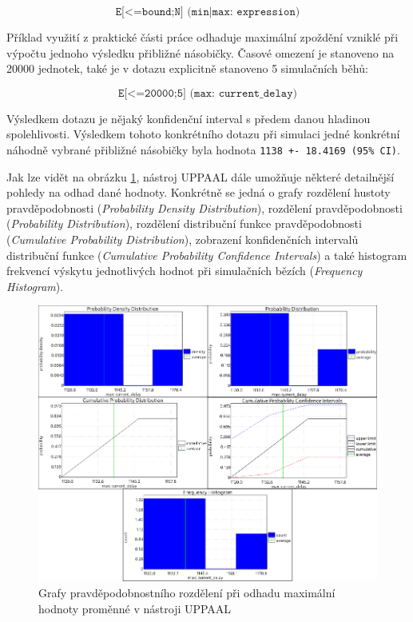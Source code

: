 \begin{equation*}
    \texttt{E[<=bound;N] (min|max: expression)}
\end{equation*}

Příklad využití z praktické části práce odhaduje maximální zpoždění vzniklé při výpočtu jednoho výsledku přibližné násobičky. Časové omezení je stanoveno na 20000 jednotek, také je v dotazu explicitně stanoveno 5 simulačních běhů:

\begin{equation*}
    \texttt{E[<=20000;5] (max: current\_delay)}
\end{equation*}

Výsledkem dotazu je nějaký konfidenční interval s předem danou hladinou spolehlivosti. Výsledkem tohoto konkrétního dotazu při simulaci jedné konkrétní náhodně vybrané přibližné násobičky byla hodnota \texttt{1138 +- 18.4169 (95\% CI)}. 

Jak lze vidět na obrázku \ref{fig:prob_plots}, nástroj UPPAAL dále umožňuje některé detailnější pohledy na odhad dané hodnoty. Konkrétně se jedná o grafy rozdělení hustoty pravděpodobnosti (\textit{Probability Density Distribution}), rozdělení pravděpodobnosti (\textit{Probability Distribution}), rozdělení distribuční funkce pravděpodobnosti (\textit{Cumulative Probability Distribution}), zobrazení konfidenčních intervalů distribuční funkce (\textit{Cumulative Probability Confidence Intervals}) a také histogram frekvencí výskytu jednotlivých hodnot při simulačních bězích (\textit{Frequency Histogram}).

\begin{figure}[H]
    \centering
    \includegraphics[width=\textwidth]{obrazky-figures/prob_plots.png}
    \caption{Grafy pravděpodobnostního rozdělení při odhadu maximální hodnoty proměnné v nástroji UPPAAL}
    \label{fig:prob_plots}
\end{figure}

